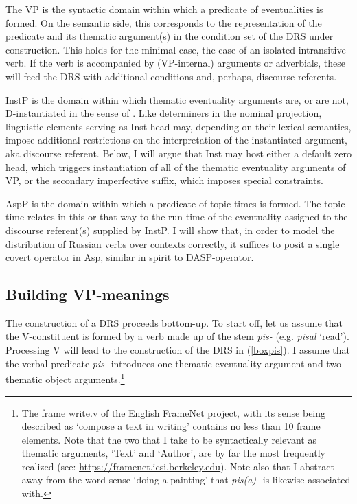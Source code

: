 \documentclass[output=paper,colorlinks,citecolor=brown]{langscibook}
\begin{document}
The VP is the syntactic domain within which a predicate of eventualities is formed. On the semantic side, this corresponds to the representation of the predicate and its thematic argument(s) in the condition set of the DRS under construction. This holds for the minimal case, the case of an isolated intransitive verb. If the verb is accompanied by (VP-internal) arguments or adverbials, these will feed the DRS with additional conditions and, perhaps, discourse referents. 

InstP is the domain within which thematic eventuality arguments are, or are not, D-instantiated in the sense of \citet{FarkasdeSwart2003}. Like determiners in the nominal projection, linguistic elements serving as Inst head may, depending on their lexical semantics, impose additional restrictions on the interpretation of the instantiated argument, aka discourse referent. Below, I will argue that Inst may host either a default zero head, which triggers instantiation of all of the thematic eventuality arguments of VP, or the secondary imperfective suffix, which imposes special constraints. 

AspP is the domain within which a predicate of topic times is formed. The topic time relates in this or that way to the run time of the eventuality assigned to the discourse referent(s) supplied by InstP. I will show that, in order to model the distribution of Russian verbs over contexts correctly, it suffices to posit a single covert operator in Asp, similar in spirit to  DASP-operator.

\subsection{Building VP-meanings} \label{S2b}
The construction of a DRS proceeds bottom-up. To start off, let us assume
that the V-constituent is formed by a verb made up of the stem \textit{pis-} (e.g. \textit{pisal} `read').  
Processing V will lead to the construction of the DRS in (\ref{boxpis}). I assume that the verbal predicate \textit{pis-} introduces one thematic eventuality argument and two thematic object arguments.\footnote{The frame write.v of the English FrameNet project, 
with its sense being described as `compose a text in writing' contains no less than
10 frame elements. Note that the two that I take to be syntactically relevant as thematic arguments, `Text' and `Author', 
are by far the most frequently realized (see: \url{https://framenet.icsi.berkeley.edu}). Note also that I abstract away from the word 
sense `doing a painting' that \textit{pis(a)-} is likewise associated with.} 
\end{document}
